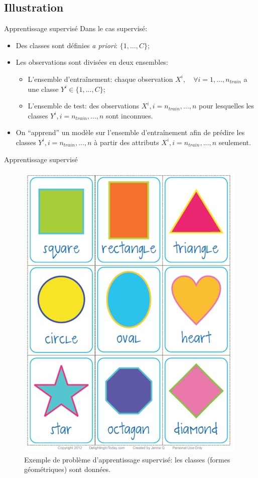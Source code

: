 \documentclass[8pt]{beamer}
\begin{document}
		\subsection{Illustration}
			\begin{frame}{Apprentissage supervisé}
				Dans le cas supervisé:
				\begin{itemize}
					\item<1-> Des classes sont définies \textit{a priori}: \(\{1,\dots, C\}\);
					\item<2-> Les observations sont divisées en deux ensembles:
						\begin{itemize}
							\item<3-> L'ensemble d'entraînement: chaque observation \(X^i, \quad \forall i=1,\dots,n_{train}\) a une classe \(Y^i \in \{1,\dots, C\}\);
							\item<4-> L'ensemble de test: des observations \(X^i, i=n_{train},\dots,n\) pour lesquelles les classes \(Y^i, i=n_{train},\dots,n\) sont inconnues.
						\end{itemize}
					\item<5-> On ``apprend'' un modèle sur l'ensemble d'entraînement afin de prédire les classes \(Y^i, i=n_{train},\dots,n\) à partir des attributs \(X^i, i=n_{train},\dots,n\) seulement.
				\end{itemize}
			\end{frame}

			\begin{frame}{Apprentissage supervisé}
				\begin{figure}[H]
					\includegraphics[height=.55\textheight]{images/samples/shapes_supervised}
					\caption*{Exemple de problème d'apprentissage supervisé: les classes (formes géométriques) sont données.}
				\end{figure}
			\end{frame}
\end{document}
